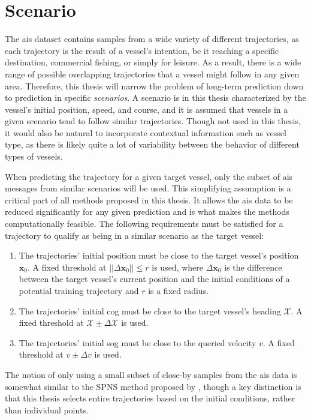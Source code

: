 \section{Scenario}
The \acrshort{ais} dataset contains samples from a wide variety of different trajectories, as each trajectory is the result of a vessel's intention, be it reaching a specific destination, commercial fishing, or simply for leisure. As a result, there is a wide range of possible overlapping trajectories that a vessel might follow in any given area. Therefore, this thesis will narrow the problem of long-term prediction down to prediction in specific \textit{scenarios}. A scenario is in this thesis characterized by the vessel's initial position, speed, and course, and it is assumed that vessels in a given scenario tend to follow similar trajectories. Though not used in this thesis, it would also be natural to incorporate contextual information such as vessel type, as there is likely quite a lot of variability between the behavior of different types of vessels. 

When predicting the trajectory for a given target vessel, only the subset of \acrshort{ais} messages from similar scenarios will be used. This simplifying assumption is a critical part of all methods proposed in this thesis. It allows the \acrshort{ais} data to be reduced significantly for any given prediction and is what makes the methods computationally feasible. The following requirements must be satisfied for a trajectory to qualify as being in a similar scenario as the target vessel:
\begin{enumerate}
    \item The trajectories' initial position must be close to the target vessel's position $\boldsymbol{x}_0$. A fixed threshold at $||\Delta \boldsymbol{x}_0|| \leq r$ is used, where $\Delta \boldsymbol{x}_0$ is the difference between the target vessel's current position and the initial conditions of a potential training trajectory and $r$ is a fixed radius.
    \item The trajectories' initial \acrshort{cog} must be close to the target vessel's heading $\mathcal{X}$. A fixed threshold at $\mathcal{X} \pm \Delta \mathcal{X}$ is used.
    \item The trajectories' initial \acrshort{sog} must be close to the queried velocity $v$. A fixed threshold at $v \pm \Delta v$ is used.
\end{enumerate}


The notion of only using a small subset of close-by samples from the \acrshort{ais} data is somewhat similar to the SPNS method proposed by \cite{Hexeberg2017AISbasedVT}, though a key distinction is that this thesis selects entire trajectories based on the initial conditions, rather than individual points. 

